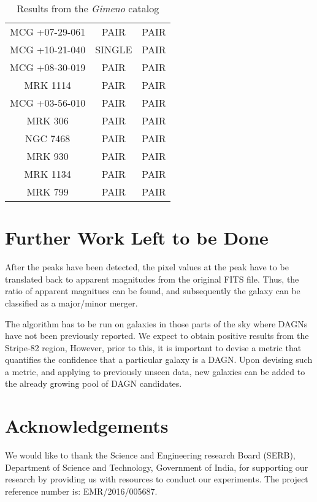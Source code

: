 \documentclass[12pt]{article}
\begin{document}
\begin{table}[!b]
{\begin{tabular}{|c|c|c|}
MCG +07-29-061 & PAIR             & PAIR             \\
MCG +10-21-040 & SINGLE           & PAIR             \\
MCG +08-30-019 & PAIR             & PAIR             \\
MRK 1114       & PAIR             & PAIR             \\
MCG +03-56-010 & PAIR             & PAIR             \\
MRK 306        & PAIR             & PAIR             \\
NGC 7468       & PAIR             & PAIR             \\
MRK 930        & PAIR             & PAIR             \\
MRK 1134       & PAIR             & PAIR             \\
MRK 799        & PAIR             & PAIR            \\

\hline

\end{tabular}
}

\caption{Results from the \textit{Gimeno} catalog}
\end{table}

\newpage

\section{Further Work Left to be Done}

After the peaks have been detected, the pixel values at the peak have to be translated back to apparent magnitudes from the original FITS file. Thus, the ratio of apparent magnitues can be found, and subsequently the galaxy can be classified as a major/minor merger.

\bigskip

The algorithm has to be run on galaxies in those parts of the sky where DAGNs have not been previously reported. We expect to obtain positive results from the Stripe-82 region, However, prior to this, it is important to devise a metric that quantifies the confidence that a particular galaxy is a DAGN. Upon devising such a metric, and applying to previously unseen data, new galaxies can be added to the already growing pool of DAGN candidates.


\section{Acknowledgements}
We would like to thank the Science and Engineering research Board (SERB), Department of Science and Technology, Government of India, for supporting our research by providing us with resources to conduct our experiments. The project reference number is: EMR/2016/005687.
\end{document}

